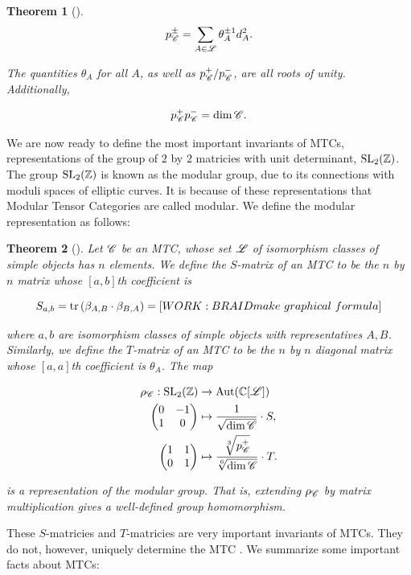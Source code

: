 \documentclass{article}
\newtheorem{theorem}{Theorem}[section]
\theoremstyle{definition}
\numberwithin{figure}{section}
\begin{document}
\begin{enumerate}[\thesection .1.]
\begin{theorem}[\cite{vafa1988toward}]
$$p^{\pm}_{\mathscr{C}}=\sum_{A\in \mathscr{L}}\theta_A^{\pm 1}d_A^2.$$

The quantities $\theta_A$ for all $A$, as well as $p^{+}_{\mathscr{C}}/p^{-}_{\mathscr{C}}$, are all roots of unity. Additionally,

$$p^{+}_{\mathscr{C}}p^{-}_{\mathscr{C}}=\dim \mathscr{C}.$$
\end{theorem}

We are now ready to define the most important invariants of MTCs, representations of the group of $2$ by $2$ matricies with unit determinant, $\mathrm{SL}_2(\mathbb{Z})$. The group $\mathrm{SL}_2(\mathbb{Z})$ is known as the modular group, due to its connections with moduli spaces of elliptic curves. It is because of these representations that Modular Tensor Categories are called modular. We define the modular representation as follows:

\begin{theorem}[\cite{bakalov2001lectures}] Let $\mathscr{C}$ be an MTC, whose set $\mathscr{L}$ of isomorphism classes of simple objects has $n$ elements. We define the $S$-matrix of an MTC to be the $n$ by $n$ matrix whose $[a,b]$th coefficient is

$$S_{a,b}=\mathrm{tr}\left(\beta_{A,B}\cdot \beta_{B,A}\right)=[WORK: BRAID make \,\, graphical \,\, formula]$$

where $a,b$ are isomorphism classes of simple objects with representatives $A,B$. Similarly, we define the $T$-matrix of an MTC to be the $n$ by $n$ diagonal matrix whose $[a,a]$th coefficient is $\theta_A$. The map

\begin{align*}
\rho_{\mathscr{C}}: \mathrm{SL}_2(\mathbb{Z})&\xrightarrow{} \mathrm{Aut}(\mathbb{C}[\mathscr{L}])\\
\begin{pmatrix}
0 & -1\\
1 & 0
\end{pmatrix}
&\mapsto \frac{1}{\sqrt{\dim \mathscr{C} }}\cdot S, \\
\begin{pmatrix}
1 & 1\\
0 & 1
\end{pmatrix}
&\mapsto \frac{\sqrt[3]{p^+_{\mathscr{C}}}}{\sqrt[6]{\dim \mathscr{C} }}\cdot T.
\end{align*}

is a representation of the modular group. That is, extending $\rho_{\mathscr{C}}$ by matrix multiplication gives a well-defined group homomorphism.
\end{theorem}

These $S$-matricies and $T$-matricies are very important invariants of MTCs. They do not, however, uniquely determine the MTC \cite{mignard2021modular}. We summarize some important facts about MTCs:


\end{enumerate}
\end{document}
